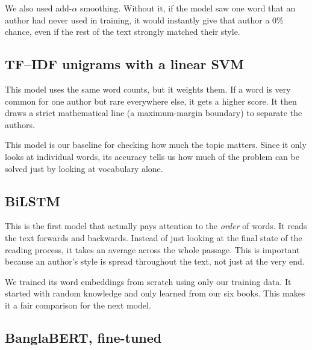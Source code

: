 We also used add-$\alpha$ smoothing. Without it, if the model saw one word that an author had never used in training, it would instantly give that author a 0\% chance, even if the rest of the text strongly matched their style.

\subsection{TF--IDF unigrams with a linear SVM}

This model uses the same word counts, but it weights them. If a word is very common for one author but rare everywhere else, it gets a higher score. It then draws a strict mathematical line (a maximum-margin boundary) to separate the authors.

This model is our baseline for checking how much the topic matters. Since it only looks at individual words, its accuracy tells us how much of the problem can be solved just by looking at vocabulary alone.

\subsection{BiLSTM}

This is the first model that actually pays attention to the \emph{order} of words. It reads the text forwards and backwards. Instead of just looking at the final state of the reading process, it takes an average across the whole passage. This is important because an author's style is spread throughout the text, not just at the very end.

We trained its word embeddings from scratch using only our training data. It started with random knowledge and only learned from our six books. This makes it a fair comparison for the next model.

\subsection{BanglaBERT, fine-tuned}

